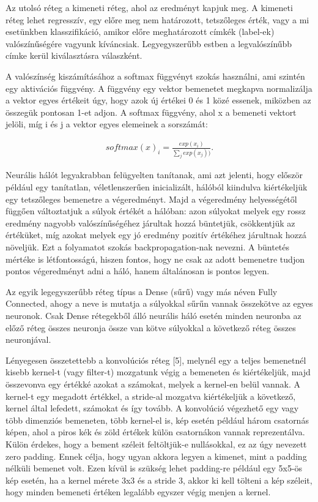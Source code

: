 Az utolsó réteg a kimeneti réteg, ahol az eredményt kapjuk meg. A kimeneti réteg lehet regresszív, egy előre meg nem határozott, tetszőleges érték, vagy a mi esetünkben klasszifikáció, amikor előre meghatározott címkék (label-ek) valószínűségére vagyunk kíváncsiak. Legyegyszerűbb estben a legvalószínűbb címke kerül kiválasztásra válaszként.

A valószínség kiszámításához a softmax függvényt szokás használni, ami szintén egy aktivációs függvény. A függvény egy vektor bemenetet megkapva normalizálja a vektor egyes értékeit úgy, hogy azok új értékei 0 és 1 közé essenek, miközben az összegük pontosan 1-et adjon. A softmax függvény, ahol x a bemeneti vektort jelöli, míg i és j a vektor egyes elemeinek a sorszámát:

\begin{align}
softmax(x)_i = \frac{exp(x_i)}{\sum_{j}^{ }exp(x_j))}.
\end{align}


Neurális hálót legyakrabban felügyelten tanítanak, ami azt jelenti, hogy először például egy tanítatlan, véletlenszerűen inicializált, hálóból kiindulva kiértékeljük egy tetszőleges bemenetre a végeredményt. Majd a végeredmény helyességétől függően változtatjuk a súlyok értékét a hálóban: azon súlyokat melyek egy rossz eredmény nagyobb valószínűségéhez járultak hozzá büntetjük, csökkentjük az értéküket, míg azokat melyek egy jó eredmény pozitív értékéhez járultnak hozzá növeljük. Ezt a folyamatot szokás backpropagation-nak nevezni. A büntetés mértéke is létfontosságú, hiszen fontos, hogy ne csak az adott bemenetre tudjon pontos végeredményt adni a háló, hanem általánosan is pontos legyen. 

Az egyik legegyszerűbb réteg típus a Dense (sűrű) vagy más néven Fully Connected, ahogy a neve is mutatja a súlyokkal sűrűn vannak összekötve az egyes neuronok. Csak Dense rétegekből álló neurális háló esetén minden neuronba az előző réteg összes neuronja össze van kötve súlyokkal a következő réteg összes neuronjával.

Lényegesen összetettebb a konvolúciós réteg [5], melynél egy a teljes bemenetnél kisebb kernel-t (vagy filter-t) mozgatunk végig a bemeneten és kiértékeljük, majd összevonva egy értékké azokat a számokat, melyek a kernel-en belül vannak. A kernel-t egy megadott értékkel, a stride-al mozgatva kiértékeljük a következő, kernel által lefedett, számokat és így tovább. A konvolúció végezhető egy vagy több dimenziós bemeneten, több kernel-el is, kép esetén például három csatornás képen, ahol a piros kék és zöld értékek külön csatornákon vannak reprezentálva. Külön érdekes, hogy a bement széleit feltöltjük-e nullásokkal, ez az úgy nevezett zero padding. Ennek célja, hogy ugyan akkora legyen a kimenet, mint a padding nélküli bemenet volt. Ezen kívül is szükség lehet padding-re például egy 5x5-ös kép esetén, ha a kernel mérete 3x3 és a stride 3, akkor ki kell tölteni a kép széleit, hogy minden bemeneti értéken legalább egyszer végig menjen a kernel.


